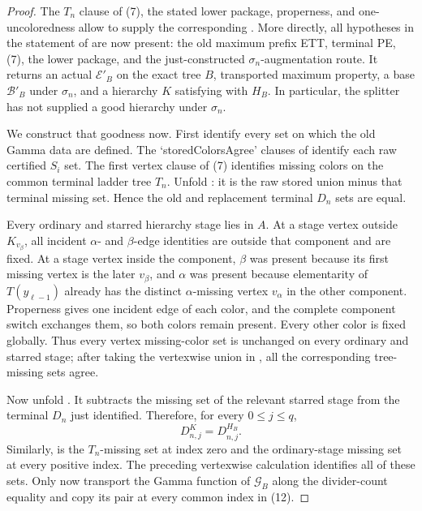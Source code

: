 \begin{proof}
The $T_n$ clause of (7), the stated lower package, properness, and
one-uncoloredness allow  to supply the corresponding
.  More directly, all hypotheses in the statement of
 are now present: the old maximum prefix ETT,
terminal PE, (7), the lower package, and the just-constructed
$\sigma_n$-augmentation route.  It returns an actual
 $\mathcal E'_B$ on the exact
tree $B$, transported maximum property, a base $\mathcal B'_B$ under
$\sigma_n$, and a hierarchy $K$ satisfying
 with $H_B$.  In particular, the splitter has
not supplied a good hierarchy under $\sigma_n$.

We construct that goodness now.  First identify every set on which the old
Gamma data are defined.  The `storedColorsAgree' clauses of
 identify each raw certified
$S_i$ set.  The first vertex clause of (7) identifies missing colors on the
common terminal ladder tree $T_n$.  Unfold
: it is the raw stored union minus that
terminal missing set.  Hence the old and replacement terminal $D_n$ sets
are equal.

Every ordinary and starred hierarchy stage lies in $A$.  At a stage vertex
outside $K_{v_\beta}$, all incident $\alpha$- and $\beta$-edge identities
are outside that component and are fixed.  At a stage vertex inside the
component, $\beta$ was present because its first missing vertex is the later
$v_\beta$, and $\alpha$ was present because elementarity of
$T(y_{\ell-1})$ already has the distinct $\alpha$-missing vertex
$v_\alpha$ in the other component.  Properness gives one incident edge of
each color, and the complete component switch exchanges them, so both
colors remain present.  Every other color is fixed globally.  Thus every
vertex missing-color set is unchanged on every ordinary and starred stage;
after taking the vertexwise union in , all the
corresponding tree-missing sets agree.

Now unfold .  It subtracts the missing
set of the relevant starred stage from the terminal $D_n$ just identified.
Therefore, for every $0\leq j\leq q$,
\[
             D^K_{n,j}=D^{H_B}_{n,j}.                           \tag{12}
\]
Similarly,  is the $T_n$-missing set
at index zero and the ordinary-stage missing set at every positive index.
The preceding vertexwise calculation identifies all of these sets.  Only
now transport the Gamma function of $\mathcal G_B$ along the divider-count
equality and copy its pair at every common index in (12).


\end{proof}

